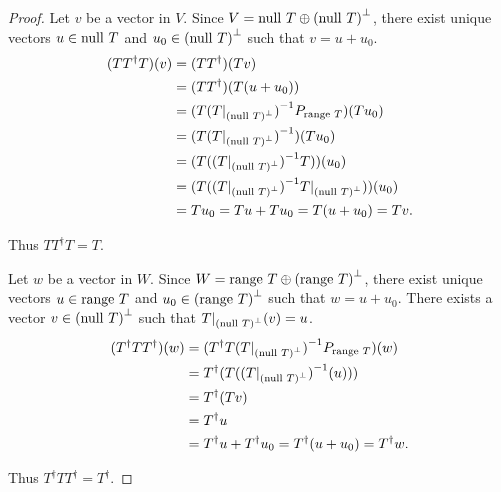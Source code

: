 \begin{proof}
    Let $v$ be a vector in $V$. Since $V = \operatorname{null}\,{T} \oplus {(\operatorname{null}\,{T})}^{\bot}$, there exist unique vectors $u\in \operatorname{null}\,{T}$ and $u_{0}\in {(\operatorname{null}\,{T})}^{\bot}$ such that $v = u + u_{0}$.
    \begin{align*}
        (TT^{\dagger}T)(v) & = (TT^{\dagger})(Tv)                                                                \\
                           & = (TT^{\dagger})(T(u + u_{0}))                                                      \\
                           & = (T{(T\vert_{{(\operatorname{null}\,{T})}^{\bot}})}^{-1}P_{\operatorname{range}\,{T}})(Tu_{0})                   \\
                           & = (T{(T\vert_{{(\operatorname{null}\,{T})}^{\bot}})}^{-1})(Tu_{0})                                \\
                           & = (T({(T\vert_{{(\operatorname{null}\,{T})}^{\bot}})}^{-1}T))(u_{0})                              \\
                           & = (T({(T\vert_{{(\operatorname{null}\,{T})}^{\bot}})}^{-1}T\vert_{{(\operatorname{null}\,{T})}^{\bot}}))(u_{0}) \\
                           & = Tu_{0} = Tu + Tu_{0} = T(u + u_{0}) = Tv.
    \end{align*}

    Thus $TT^{\dagger}T = T$.

    \bigskip

    Let $w$ be a vector in $W$. Since $W = \operatorname{range}\,{T}\oplus {(\operatorname{range}\,{T})}^{\bot}$, there exist unique vectors $u\in \operatorname{range}\,{T}$ and $u_{0}\in {(\operatorname{range}\,{T})}^{\bot}$ such that $w = u + u_{0}$. There exists a vector $v\in {(\operatorname{null}\,{T})}^{\bot}$ such that $T\vert_{{(\operatorname{null}\,{T})}^{\bot}}(v) = u$.
    \begin{align*}
        (T^{\dagger}TT^{\dagger})(w) & = (T^{\dagger}T{(T\vert_{{(\operatorname{null}\,{T})}^{\bot}})}^{-1}P_{\operatorname{range}\,{T}})(w)    \\
                                     & = T^{\dagger}(T({(T\vert_{{(\operatorname{null}\,{T})}^{\bot}})}^{-1}(u)))               \\
                                     & = T^{\dagger}(Tv)                                                          \\
                                     & = T^{\dagger}u                                                             \\
                                     & = T^{\dagger}u + T^{\dagger}u_{0} = T^{\dagger}(u + u_{0}) = T^{\dagger}w.
    \end{align*}

    Thus $T^{\dagger}TT^{\dagger} = T^{\dagger}$.
\end{proof}
\newpage

